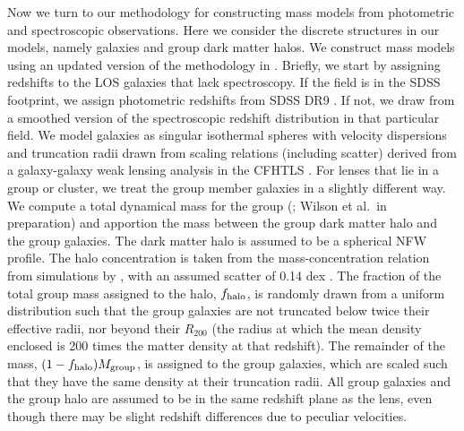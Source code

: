 \documentclass{emulateapj}
\begin{document}
Now we turn to our methodology for constructing mass models from photometric and spectroscopic observations. Here we consider the discrete structures in our models, namely galaxies and group dark matter halos. We construct mass models using an updated version of the methodology in \citet{Wong11}. Briefly, we start by assigning redshifts to the LOS galaxies that lack spectroscopy. If the field is in the SDSS footprint, we assign photometric redshifts from SDSS DR9 \citep{Ahn12, Csabai03}. If not, we draw from a smoothed version of the spectroscopic redshift distribution in that particular field. We model galaxies as singular isothermal spheres with velocity dispersions and truncation radii drawn from scaling relations (including scatter) derived from a galaxy-galaxy weak lensing analysis in the CFHTLS \citep{Brimioulle13}. For lenses that lie in a group or cluster, we treat the group member galaxies in a slightly different way. We compute a total dynamical mass for the group (\citealt{Girardi98,Momcheva06,Momcheva15}; Wilson et al.\ in preparation) and apportion the mass between the group dark matter halo and the group galaxies. The dark matter halo is assumed to be a spherical NFW profile. The halo concentration is taken from the mass-concentration relation from simulations by \citet{Zhao09}, with an assumed scatter of 0.14 dex \citep{Bullock01}. The fraction of the total group mass assigned to the halo, $f_{\rm{halo}}$, is randomly drawn from a uniform distribution such that the group galaxies are not truncated below twice their effective radii, nor beyond their $R_{200}$ (the radius at which the mean density enclosed is 200 times the matter density at that redshift). The remainder of the mass, $(1-f_{\rm{halo}})M_{\rm{group}}$, is assigned to the group galaxies, which are scaled such that they have the same density at their truncation radii. All group galaxies and the group halo are assumed to be in the same redshift plane as the lens, even though there may be slight redshift differences due to peculiar velocities. 
\end{document}

